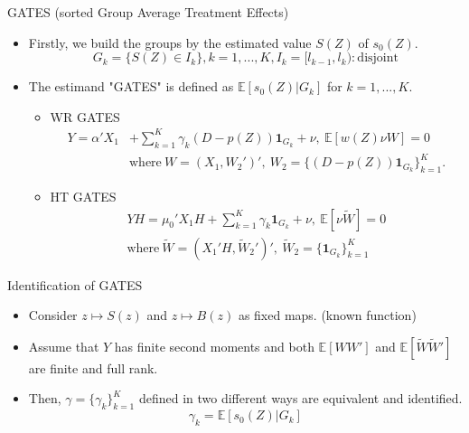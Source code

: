 \documentclass[xcolor=svgnames,aspectratio=169]{beamer}
\newcommand{\E}{\mathbb{E}}
\begin{document}
\begin{frame}{GATES (sorted Group Average Treatment Effects)}
    \begin{itemize}
        \item Firstly, we build the groups by the estimated value $S(Z)$ of $s_0(Z)$.
        \[
        G_k=\{S(Z)\in I_k\}, k=1,...,K, I_k=[l_{k-1},l_k) : \text{disjoint}
        \]
        \item The estimand "GATES" is defined as $\E[s_0(Z)|G_k]$ for $k=1,...,K$.
        \begin{itemize}
            \item WR GATES
        \begin{align*}
            Y=\alpha'X_1&+\sum_{k=1}^{K}\gamma_k(D-p(Z))\mathbf{1}_{G_k}+\nu, \  \E[w(Z)\nu W]=0 \\
            &\text{where} \ W=(X_1, W_2')', \ W_2=\{(D-p(Z))\mathbf{1}_{G_k}\}_{k=1}^K.
        \end{align*}
        \item HT GATES
        \begin{align*}
            YH=\mu_0'X_1H+\sum_{k=1}^{K} \gamma_k\mathbf{1}_{G_k}+\nu, \ \E[\nu \tilde{W}]=0 \\
            \text{where} \ \tilde{W}=(X_1'H, \tilde{W}_2')', \ \tilde{W}_2=\{\mathbf{1}_{G_k}\}_{k=1}^K
        \end{align*}
        \end{itemize}
    \end{itemize}
\end{frame}

\begin{frame}{Identification of GATES}
    \begin{itemize}
        \begin{tcolorbox}[colframe=Cyan,title=Theorem 3]
        \begin{itemize}
            \item Consider $z\mapsto S(z)$ and $z\mapsto B(z)$ as fixed maps. (known function)
            \item Assume that $Y$ has finite second moments and  both $\E[WW']$ and $\E[\tilde{W}\tilde{W}']$ are finite and full rank.
            \item Then, $\gamma=\{\gamma_k\}_{k=1}^K$ defined in two different ways are equivalent and identified.
            \[
            \gamma_k=\E[s_0(Z)|G_k]
            \]
        \end{itemize}
    \end{tcolorbox}
    \end{itemize}
\end{frame}
\end{document}
